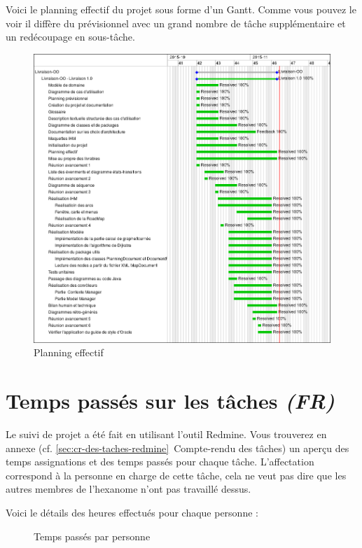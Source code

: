 \documentclass[paper=a4, fontsize=11pt]{report}
\numberwithin{equation}{section}		%
\numberwithin{figure}{section}		%
\numberwithin{table}{section}		%
\renewcommand{\it}[1]{\textit{#1}}
\begin{document}
Voici le planning effectif du projet sous forme d'un Gantt. Comme vous pouvez le voir il diffère du prévisionnel avec un grand nombre de tâche supplémentaire et un redécoupage en sous-tâche.

\begin{figure}[H]
\centering
\includegraphics[scale=0.5,angle=0]{redmine/gantt-real.png}
\caption{Planning effectif}
\end{figure}

\section{Temps passés sur les tâches \it{(FR)}}
\label{sec:temps-passes-sur-les-taches}

Le suivi de projet a été fait en utilisant l'outil Redmine. Vous trouverez en annexe (cf. \ref{sec:cr-des-taches-redmine}~Compte-rendu des tâches) un aperçu des temps assignations et des temps passés pour chaque tâche. L'affectation correspond à la personne en charge de cette tâche, cela ne veut pas dire que les autres membres de l'hexanome n'ont pas travaillé dessus.

Voici le détails des heures effectués pour chaque personne :

\begin{figure}[H]
\centering
{}
\caption{Temps passés par personne}
\end{figure}
\end{document}
